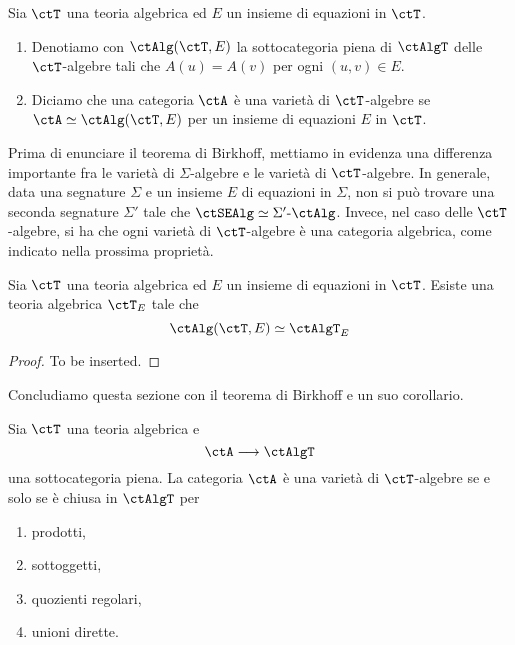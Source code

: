 \begin{definition}\label{def_var_AlgT}
Sia $\ctT$ una teoria algebrica ed $E$ un insieme di equazioni in $\ctT$.
\begin{enumerate}
\item Denotiamo con $\ctAlg(\ctT,E)$ la sottocategoria piena di $\ctAlgT$ delle $\ctT$-algebre tali che $A(u)=A(v)$ per ogni $(u,v) \in E$.
\item Diciamo che una categoria $\ctA$ è una varietà di $\ctT$-algebre se $\ctA \simeq \ctAlg(\ctT,E)$ per un insieme di equazioni $E$ in $\ctT$.
\end{enumerate}
\end{definition} 

Prima di enunciare il teorema di Birkhoff, mettiamo in evidenza una differenza importante fra le varietà di $\Sigma$-algebre e le varietà di
$\ctT$-algebre. In generale, data una segnature $\Sigma$ e un insieme $E$ di equazioni in $\Sigma$, non si può trovare una seconda
segnature $\Sigma'$ tale che $\ctSEAlg \simeq \Sigma'\mbox{-}\ctAlg$. Invece, nel caso delle $\ctT$-algebre, si ha che ogni varietà di 
$\ctT$-algebre è una categoria algebrica, come indicato nella prossima proprietà.

\begin{proposition}\label{prop_var_alg_alg}
Sia $\ctT$ una teoria algebrica ed $E$ un insieme di equazioni in $\ctT$. Esiste una teoria algebrica $\ctT_E$ tale che
\[
  \ctAlg(\ctT,E) \simeq \ctAlgT_{E} 
\]
\end{proposition}

\begin{proof}
To be inserted.
\end{proof}

Concludiamo questa sezione con il teorema di Birkhoff e un suo corollario.

\begin{theorem}\label{teo_Birkhoff_AlgT}
Sia $\ctT$ una teoria algebrica e 
\[
  \ctA \fun \ctAlgT 
\]
una sottocategoria piena. La categoria $\ctA$ è una varietà di $\ctT$-algebre se e solo se è chiusa in $\ctAlgT$ per
\begin{enumerate}
\item prodotti,
\item sottoggetti,
\item quozienti regolari,
\item unioni dirette.
\end{enumerate}
\end{theorem}

